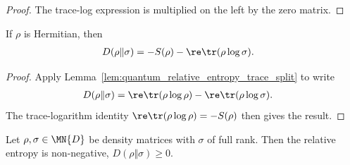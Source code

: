 \begin{proof}\leanok
    The trace-log expression is multiplied on the left by the zero matrix.
\end{proof}

\begin{theorem}
    \label{thm:quantum_relative_entropy_entropy_form}
    \leanok
    If $\rho$ is Hermitian, then
    \begin{align}
        D(\rho\Vert\sigma)
         & =-S(\rho)-\re\tr(\rho\log\sigma).
        \label{eq:entropy_relative_entropy_form}
    \end{align}
\end{theorem}

\begin{proof}\leanok
    Apply Lemma~\ref{lem:quantum_relative_entropy_trace_split} to write
    \begin{align}
        D(\rho\Vert\sigma)
         & =\re\tr(\rho\log\rho)-\re\tr(\rho\log\sigma).
        \notag
    \end{align}
    The trace-logarithm identity $\re\tr(\rho\log\rho)=-S(\rho)$ then gives the
    result.
\end{proof}

\begin{theorem}\label{thm:klein_inequality}
    \leanok
    Let $\rho,\sigma\in\MN{D}$ be density matrices with $\sigma$ of full rank.
    Then the relative entropy is non-negative, $D(\rho\Vert\sigma)\ge0$.
\end{theorem}

